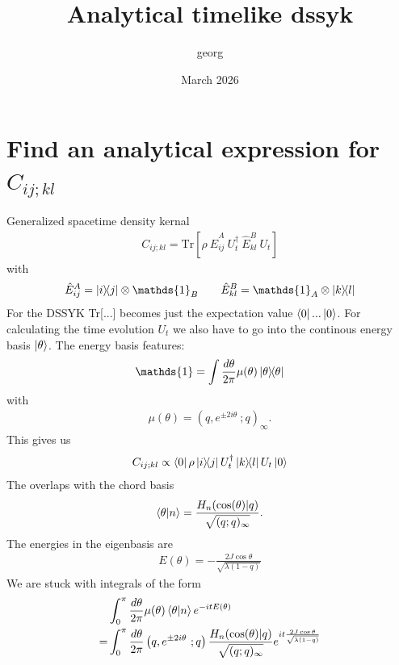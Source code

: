 \documentclass{scrarticle}
\title{Analytical timelike dssyk}
\author{georg}
\date{March 2026}
\begin{document}
\maketitle

\section{Find an analytical expression for $C_{ij;kl}$}

Generalized spacetime density kernal 
\begin{align}
    C_{ij; kl} = \text{Tr} \left[ \rho \ \hat{E}_{ij}^A \ U_t^\dagger \ \hat{E}_{kl}^B \ U_t \right]
\end{align}
with 
\begin{align}
    \hat{E}_{ij}^A = \ketbra{i}{j} \otimes  \mathds{1}_B \qquad \hat{E}_{kl}^B =  \mathds{1}_A \otimes \ketbra{k}{l}
\end{align}
For the DSSYK Tr[...] becomes just the expectation value $\bra{0}...\ket{0}$. For calculating the time evolution $U_t$ we also have to go into the continous energy basis $\ket{\theta}$. The energy basis features:
\begin{align}
    \mathds{1} = \int \frac{d\theta }{2 \pi} \mu(\theta) \ketbra{\theta}{\theta}
\end{align}
with 
\begin{align}
    \mu(\theta) = \left( q, e^{\pm 2 i\theta} \ ; q \right)_\infty.
\end{align}
This gives us 
\begin{align}
     C_{ij; kl} \propto \bra{0} \rho \ketbra{i}{j}  U_t^\dagger \ketbra{k}{l} U_t  \ket{0}
\end{align}
The overlaps with the chord basis 
\begin{align}
    \braket{\theta | n} = \frac{H_n(\cos(\theta)|q)}{\sqrt{(q; q)_\infty}}.
\end{align}
The energies in the eigenbasis are
\begin{align}
    E(\theta) = -\frac{2J \cos{\theta}}{\sqrt{\lambda(1-q)}}
\end{align}
We are stuck with integrals of the form
\begin{align}
    & \int_0^\pi \frac{d\theta}{2 \pi} \mu(\theta) \braket{\theta|n} e^{-i t E(\theta)} \\
    =& \int_0^\pi \frac{d\theta}{2 \pi} \left( q, e^{\pm 2 i\theta} \ ; q \right) \frac{H_n(\cos(\theta)|q)}{\sqrt{(q; q)_\infty}} e^{i t \frac{2J \cos{\theta}}{\sqrt{\lambda(1-q)}}}
\end{align}
\end{document}
